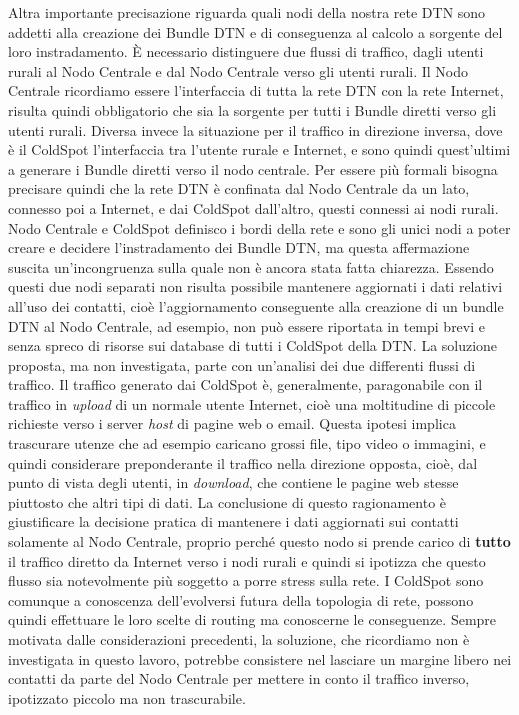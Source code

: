 \documentclass[12pt,a4paper,oneside]{book}
\begin{document}
		Altra importante precisazione riguarda quali nodi della nostra rete DTN sono addetti alla creazione dei Bundle DTN e di conseguenza al calcolo a sorgente del loro instradamento. \`E necessario distinguere due flussi di traffico, dagli utenti rurali al Nodo Centrale e dal Nodo Centrale verso gli utenti rurali. Il Nodo Centrale ricordiamo essere l'interfaccia di tutta la rete DTN con la rete Internet, risulta quindi obbligatorio che sia la sorgente per tutti i Bundle diretti verso gli utenti rurali. Diversa invece la situazione per il traffico in direzione inversa, dove è il ColdSpot l'interfaccia tra l'utente rurale e Internet, e sono quindi quest'ultimi a generare i Bundle diretti verso il nodo centrale. Per essere più formali bisogna precisare quindi che la rete DTN è confinata dal Nodo Centrale da un lato, connesso poi a Internet, e dai ColdSpot dall'altro, questi connessi ai nodi rurali. Nodo Centrale e ColdSpot definisco i bordi della rete e sono gli unici nodi a poter creare e decidere l'instradamento dei Bundle DTN, ma questa affermazione suscita un'incongruenza sulla quale non è ancora stata fatta chiarezza. Essendo questi due nodi separati non risulta possibile mantenere aggiornati i dati relativi all'uso dei contatti, cioè l'aggiornamento conseguente alla creazione di un bundle DTN al Nodo Centrale, ad esempio, non può essere riportata in tempi brevi e senza spreco di risorse sui database di tutti i ColdSpot della DTN. La soluzione proposta, ma non investigata, parte con un'analisi dei due differenti flussi di traffico. Il traffico generato dai ColdSpot è, generalmente, paragonabile con il traffico in {\it upload} di un normale utente Internet, cioè una moltitudine di piccole richieste verso i server {\it host} di pagine web o email. Questa ipotesi implica trascurare utenze che ad esempio caricano grossi file, tipo video o immagini, e quindi considerare preponderante il traffico nella direzione opposta, cioè, dal punto di vista degli utenti, in {\it download}, che contiene le pagine web stesse piuttosto che altri tipi di dati. La conclusione di questo ragionamento è giustificare la decisione pratica di mantenere i dati aggiornati sui contatti solamente al Nodo Centrale, proprio perché questo nodo si prende carico di {\bf tutto} il traffico diretto da Internet verso i nodi rurali e quindi si ipotizza che questo flusso sia notevolmente più soggetto a porre stress sulla rete. I ColdSpot sono comunque a conoscenza dell'evolversi futura della topologia di rete, possono quindi effettuare le loro scelte di routing ma conoscerne le conseguenze. Sempre motivata dalle considerazioni precedenti, la soluzione, che ricordiamo non è investigata in questo lavoro, potrebbe consistere nel lasciare un margine libero nei contatti da parte del Nodo Centrale per mettere in conto il traffico inverso, ipotizzato piccolo ma non trascurabile. 
		
\end{document}
